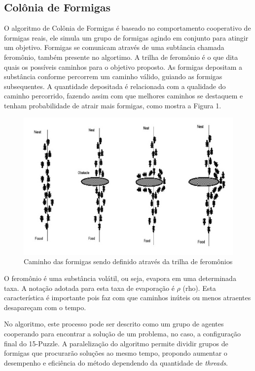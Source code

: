 \documentclass[12pt]{article}
\begin{document}
\subsection{Col\^onia de Formigas}
O algoritmo de Col\^onia de Formigas \'e baseado no comportamento cooperativo de formigas reais, ele simula um grupo de formigas agindo em conjunto para atingir um objetivo. Formigas se comunicam atrav\'es de uma subt\^ancia chamada ferom\^onio, tamb\'em presente no algortimo. A trilha de ferom\^onio \'e o que dita quais os poss\'iveis caminhos para o objetivo proposto. As formigas depositam a subst\^ancia conforme percorrem um caminho v\'alido, guiando as formigas subsequentes. A quantidade depositada é relacionada com a qualidade do caminho percorrido, fazendo assim com que melhores caminhos se destaquem e tenham probabilidade de atrair mais formigas, como mostra a Figura 1.

\begin{figure}[]
\centering
\includegraphics[width=.9\textwidth]{antsystem.jpg}
\caption{Caminho das formigas sendo definido através da trilha de feromônios}
\label{fig:figura1}
\end{figure}

O feromônio é uma substância volátil, ou seja, evapora em uma determinada taxa. A notação adotada para esta taxa de evaporação é $\rho$ (rho). Esta característica é importante pois faz com que caminhos inúteis ou menos atraentes desapareçam com o tempo.

No algoritmo, este processo pode ser descrito como um grupo de agentes cooperando para encontrar a solução de um problema, no caso, a configuração final do 15-Puzzle. A paralelização do algoritmo permite dividir grupos de formigas que procurarão soluções ao mesmo tempo, propondo aumentar o desempenho e eficiência do método dependendo da quantidade de \textit{threads}.
\end{document}

